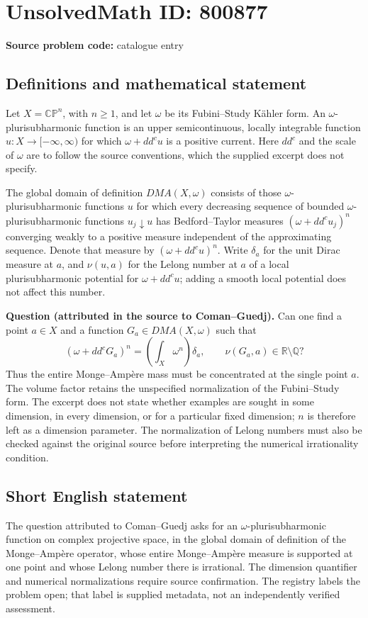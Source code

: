 \documentclass[11pt]{article}
\newcommand{\Q}{\mathbb{Q}}
\newcommand{\R}{\mathbb{R}}
\newcommand{\C}{\mathbb{C}}
\begin{document}
\section*{UnsolvedMath ID: 800877}
\textbf{Source problem code:} catalogue entry
\subsection{Definitions and mathematical statement}
Let \(X=\C\mathbb{P}^{n}\), with \(n\geq 1\), and let \(\omega\) be its Fubini--Study K\"ahler form. An \(\omega\)-plurisubharmonic function is an upper semicontinuous, locally integrable function \(u:X\to[-\infty,\infty)\) for which \(\omega+dd^{c}u\) is a positive current. Here \(dd^{c}\) and the scale of \(\omega\) are to follow the source conventions, which the supplied excerpt does not specify.

The global domain of definition \(DMA(X,\omega)\) consists of those \(\omega\)-plurisubharmonic functions \(u\) for which every decreasing sequence of bounded \(\omega\)-plurisubharmonic functions \(u_j\downarrow u\) has Bedford--Taylor measures \((\omega+dd^{c}u_j)^n\) converging weakly to a positive measure independent of the approximating sequence. Denote that measure by \((\omega+dd^{c}u)^n\). Write \(\delta_a\) for the unit Dirac measure at \(a\), and \(\nu(u,a)\) for the Lelong number at \(a\) of a local plurisubharmonic potential for \(\omega+dd^{c}u\); adding a smooth local potential does not affect this number.

\textbf{Question (attributed in the source to Coman--Guedj).} Can one find a point \(a\in X\) and a function \(G_a\in DMA(X,\omega)\) such that
\[
 (\omega+dd^{c}G_a)^n
 =\left(\int_X\omega^n\right)\delta_a,
 \qquad
 \nu(G_a,a)\in\R\setminus\Q?
\]
Thus the entire Monge--Amp\`ere mass must be concentrated at the single point \(a\). The volume factor retains the unspecified normalization of the Fubini--Study form. The excerpt does not state whether examples are sought in some dimension, in every dimension, or for a particular fixed dimension; \(n\) is therefore left as a dimension parameter. The normalization of Lelong numbers must also be checked against the original source before interpreting the numerical irrationality condition.
\subsection{Short English statement}
The question attributed to Coman--Guedj asks for an \(\omega\)-plurisubharmonic function on complex projective space, in the global domain of definition of the Monge--Amp\`ere operator, whose entire Monge--Amp\`ere measure is supported at one point and whose Lelong number there is irrational. The dimension quantifier and numerical normalizations require source confirmation. The registry labels the problem open; that label is supplied metadata, not an independently verified assessment.
\end{document}
